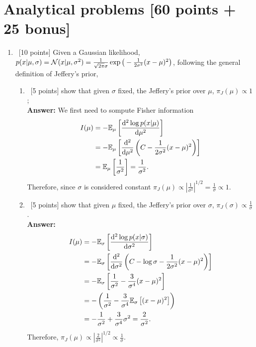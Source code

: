 \documentclass[12pt, fullpage,letterpaper]{article}
\def\red{\color{red}}
\def\blackblue{\color{black!40!blue}}
\begin{document}
\section*{Analytical problems [60 points + 25 bonus]}	
\label{sec:q1}
\begin{enumerate}
\item~[10 points] Given a Gaussian likelihood, $p(x|\mu, \sigma)=\mathcal{N}(x|\mu, \sigma^2)=\frac{1}{\sqrt{2\pi}\sigma}\exp\big(-\frac{1}{2\sigma^2}(x-\mu)^2\big)$,  following the general definition of Jeffery's prior, 
\begin{enumerate}
	\item~[5 points] show that given $\sigma$ fixed, the Jeffery's prior over $\mu$, $\pi_J(\mu) \propto 1$;\\
	{\bf \red Answer:}{\blackblue
	We first need to sompute Fisher information 
	\begin{align*}
	I(\mu) &= -\mathbb{E}_{\mu}\left[\frac{{\rm d}^2 \log p(x|\mu)}{{\rm d}\mu^2}\right]\\
	& = - \mathbb{E}_{\mu}\left[\frac{{\rm d}^2}{{\rm d}\mu^2}\left(C -\frac{1}{2\sigma^2}(x-\mu)^2 \right)\right]\\
	& = \mathbb{E}_{\mu}\left[\frac{1}{\sigma^2}\right] = \frac{1}{\sigma^2} .
	\end{align*}
	Therefore, since $\sigma$ is considered constant
	$\pi_J(\mu) \propto \left|\frac{1}{\sigma^2} \right|^{1/2} = \frac{1}{\sigma} \propto 1.$
	}
	\item~[5 points] show that given $\mu$ fixed, the Jeffery's prior over $\sigma$, $\pi_J(\sigma) \propto \frac{1}{\sigma}$.\\
	{\bf \red Answer:} {\blackblue
	\begin{align*}
	I(\mu) &= -\mathbb{E}_{\sigma}\left[\frac{{\rm d}^2 \log p(x|\sigma)}{{\rm d}\sigma^2}\right]\\
	& = - \mathbb{E}_{\sigma}\left[\frac{{\rm d}^2}{{\rm d}\sigma^2}\left(C -\log \sigma -\frac{1}{2\sigma^2}(x-\mu)^2 \right)\right]\\
	& = - \mathbb{E}_{\sigma}\left[\frac{1}{\sigma^2}- \frac{3}{\sigma^4}(x-\mu)^2\right]\\
	& = -\left(\frac{1}{\sigma^2} - \frac{3}{\sigma^4}\mathbb{E}_{\sigma}\left[(x-\mu)^2\right]\right) \\
	& = -\frac{1}{\sigma^2} +\frac{3}{\sigma^4} \sigma^2 = \frac{2}{\sigma^2}.
	\end{align*}
	Therefore, $\pi_J(\mu) \propto \left | \frac{2}{\sigma^2} \right|^{1/2} \propto \frac{1}{\sigma}.$
	}
\end{enumerate}


\end{enumerate}
\end{document}
